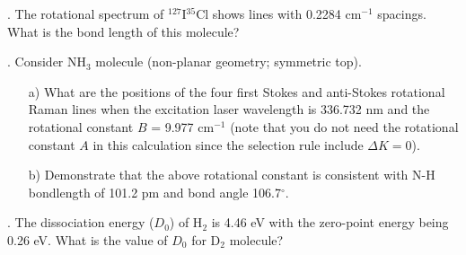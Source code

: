 
. The rotational spectrum of $^{127}$I$^{35}$Cl shows lines with 0.2284 cm$^{-1}$ spacings. What is the bond length of this molecule?\\


. Consider NH$_3$ molecule (non-planar geometry; symmetric top).

\begin{itemize}
\item[a)] What are the positions of the four first Stokes and anti-Stokes rotational Raman lines when the excitation laser wavelength is 336.732 nm and the rotational constant $B$ = 9.977 cm$^{-1}$ (note that you do not need the rotational constant $A$ in this calculation since the selection rule include $\Delta K = 0$).

\item[b)] Demonstrate that the above rotational constant is consistent with N-H bondlength of 101.2 pm and bond angle 106.7$^\circ$. 

\end{itemize}


. The dissociation energy ($D_0$) of H$_2$ is 4.46 eV with the zero-point energy being 0.26 eV. What is the value of $D_0$ for D$_2$ molecule?\\



